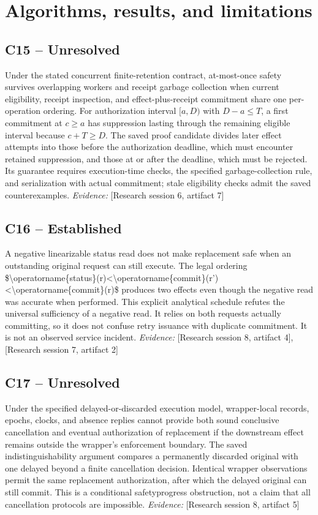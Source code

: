 \documentclass[11pt]{article}
\begin{document}
\section{Algorithms, results, and limitations}
\begin{sloppypar}
\small
\subsection{C15 -- Unresolved}
Under the stated concurrent finite-retention contract, at-most-once safety survives overlapping workers and receipt garbage collection when current eligibility, receipt inspection, and effect-plus-receipt commitment share one per-operation ordering. For authorization interval $[a,D)$ with $D-a\leq T$, a first commitment at $c\geq a$ has suppression lasting through the remaining eligible interval because $c+T\geq D$.
The saved proof candidate divides later effect attempts into those before the authorization deadline, which must encounter retained suppression, and those at or after the deadline, which must be rejected. Its guarantee requires execution-time checks, the specified garbage-collection rule, and serialization with actual commitment; stale eligibility checks admit the saved counterexamples.
\textit{Evidence: }[Research session 6, artifact 7]
\subsection{C16 -- Established}
A negative linearizable status read does not make replacement safe when an outstanding original request can still execute. The legal ordering \$\textbackslash{}operatorname\{status\}(r)\textless{}\textbackslash{}operatorname\{commit\}(r')\textless{}\textbackslash{}operatorname\{commit\}(r)\$ produces two effects even though the negative read was accurate when performed.
This explicit analytical schedule refutes the universal sufficiency of a negative read. It relies on both requests actually committing, so it does not confuse retry issuance with duplicate commitment. It is not an observed service incident.
\textit{Evidence: }[Research session 8, artifact 4], [Research session 7, artifact 2]
\subsection{C17 -- Unresolved}
Under the specified delayed-or-discarded execution model, wrapper-local records, epochs, clocks, and absence replies cannot provide both sound conclusive cancellation and eventual authorization of replacement if the downstream effect remains outside the wrapper's enforcement boundary.
The saved indistinguishability argument compares a permanently discarded original with one delayed beyond a finite cancellation decision. Identical wrapper observations permit the same replacement authorization, after which the delayed original can still commit. This is a conditional safety\textendash{}progress obstruction, not a claim that all cancellation protocols are impossible.
\textit{Evidence: }[Research session 8, artifact 5]

\end{sloppypar}
\end{document}
